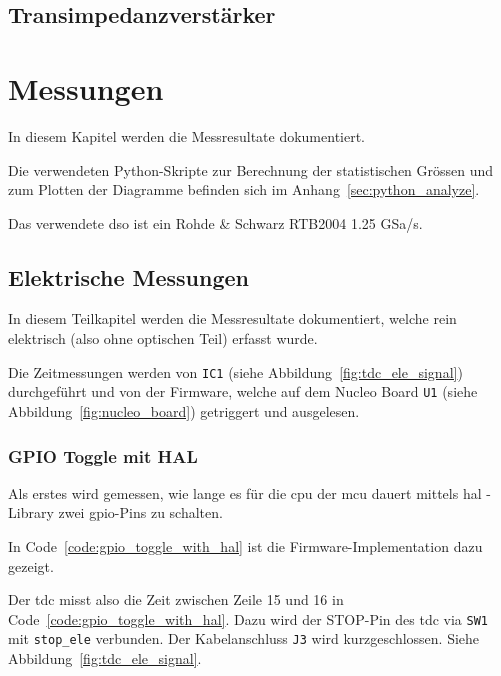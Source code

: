\documentclass[11pt,a4paper,hidelinks]{article}
\begin{document}
\subsection{Transimpedanzverstärker}

\pagebreak

\section{Messungen}

In diesem Kapitel werden die Messresultate dokumentiert.

Die verwendeten Python-Skripte zur Berechnung der statistischen Grössen und zum Plotten der Diagramme befinden sich im
Anhang~\ref{sec:python_analyze}.

Das verwendete \acrfull{dso} ist ein Rohde \& Schwarz RTB2004 1.25 GSa/s.

\subsection{Elektrische Messungen}

In diesem Teilkapitel werden die Messresultate dokumentiert, welche rein elektrisch (also ohne optischen Teil) erfasst
wurde.

Die Zeitmessungen werden von \lstinline|IC1| (siehe Abbildung~\ref{fig:tdc_ele_signal}) durchgeführt und von der
Firmware, welche auf dem Nucleo Board \lstinline|U1| (siehe Abbildung~\ref{fig:nucleo_board}) getriggert und ausgelesen.

\subsubsection{GPIO Toggle mit HAL}\label{sec:gpio_toggle_with_hal}

Als erstes wird gemessen, wie lange es für die \acrshort{cpu} der \acrshort{mcu} dauert mittels \acrfull{hal} - Library
\cite{st2020stm32f0_hal} zwei \acrshort{gpio}-Pins zu schalten.

In Code~\ref{code:gpio_toggle_with_hal} ist die Firmware-Implementation dazu gezeigt.



Der \acrshort{tdc} misst also die Zeit zwischen Zeile 15 und 16 in Code~\ref{code:gpio_toggle_with_hal}. Dazu wird der
STOP-Pin des \acrshort{tdc} via \lstinline|SW1| mit \lstinline|stop_ele| verbunden. Der Kabelanschluss \lstinline|J3|
wird kurzgeschlossen. Siehe Abbildung~\ref{fig:tdc_ele_signal}.
\end{document}
